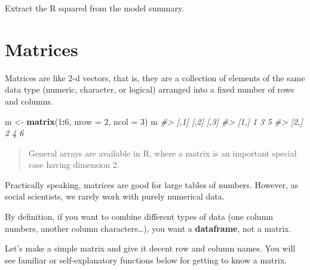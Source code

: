 \documentclass[
]{book}
\newenvironment{Shaded}{\begin{snugshade}}{\end{snugshade}}
\newcommand{\CommentTok}[1]{\textcolor[rgb]{0.56,0.35,0.01}{\textit{#1}}}
\newcommand{\DataTypeTok}[1]{\textcolor[rgb]{0.13,0.29,0.53}{#1}}
\newcommand{\DecValTok}[1]{\textcolor[rgb]{0.00,0.00,0.81}{#1}}
\newcommand{\KeywordTok}[1]{\textcolor[rgb]{0.13,0.29,0.53}{\textbf{#1}}}
\newcommand{\NormalTok}[1]{#1}
\newcommand{\OperatorTok}[1]{\textcolor[rgb]{0.81,0.36,0.00}{\textbf{#1}}}
\newcommand{\StringTok}[1]{\textcolor[rgb]{0.31,0.60,0.02}{#1}}
\begin{document}
Extract the R squared from the model summary.

\hypertarget{matrices}{%
\section{Matrices}\label{matrices}}

Matrices are like 2-d vectors, that is, they are a collection of elements of the same data type (numeric, character, or logical) arranged into a fixed number of rows and columns.

\begin{Shaded}
\begin{Highlighting}[]
\NormalTok{m <-}\StringTok{ }\KeywordTok{matrix}\NormalTok{(}\DecValTok{1}\OperatorTok{:}\DecValTok{6}\NormalTok{, }\DataTypeTok{nrow =} \DecValTok{2}\NormalTok{, }\DataTypeTok{ncol =} \DecValTok{3}\NormalTok{)}
\NormalTok{m}
\CommentTok{#>      [,1] [,2] [,3]}
\CommentTok{#> [1,]    1    3    5}
\CommentTok{#> [2,]    2    4    6}
\end{Highlighting}
\end{Shaded}

\begin{quote}
General arrays are available in R, where a matrix is an important special case having dimension 2.
\end{quote}

Practically speaking, matrices are good for large tables of numbers. However, as social scientists, we rarely work with purely numerical data.

By definition, if you want to combine different types of data (one column numbers, another column characters\ldots), you want a \textbf{dataframe}, not a matrix.

Let's make a simple matrix and give it decent row and column names. You will see familiar or self-explanatory functions below for getting to know a matrix.
\end{document}
